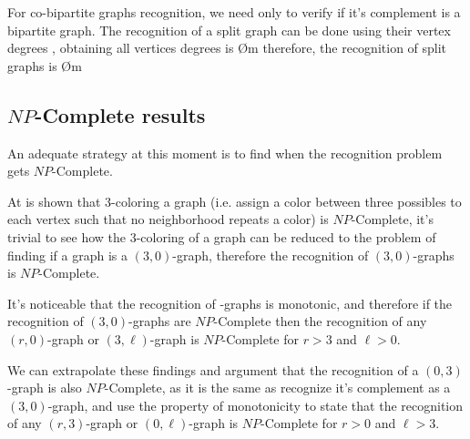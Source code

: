 For co-bipartite graphs recognition, we need only to verify if it's complement is a bipartite graph.
The recognition of a split graph can be done using their vertex degrees , obtaining all vertices degrees is \O{m} therefore, the recognition of split graphs is \O{m}

\subsection{$NP$-Complete results}

An adequate strategy at this moment is to find when the recognition problem gets $NP$-Complete.

At \cite{gareyjohnson} is shown that 3-coloring a graph (i.e. assign a color between three possibles to each vertex such that no neighborhood repeats a color) is $NP$-Complete,
it's trivial to see how the 3-coloring of a graph can be reduced to the problem of finding if a graph is a $(3,0)$-graph,
therefore the recognition of $(3,0)$-graphs is $NP$-Complete.

It's noticeable that the recognition of \RL-graphs is monotonic, and therefore if the recognition of $(3,0)$-graphs are $NP$-Complete then the recognition of any $(r,0)$-graph or $(3,\ell)$-graph is $NP$-Complete for $r > 3$ and $\ell >0$.

We can extrapolate these findings and argument that the recognition of a $(0,3)$-graph is also $NP$-Complete,
as it is the same as recognize it's complement as a $(3,0)$-graph,
and use the property of monotonicity to state that the recognition of any $(r,3)$-graph or $(0,\ell)$-graph is $NP$-Complete for $r > 0$ and $\ell >3$.

